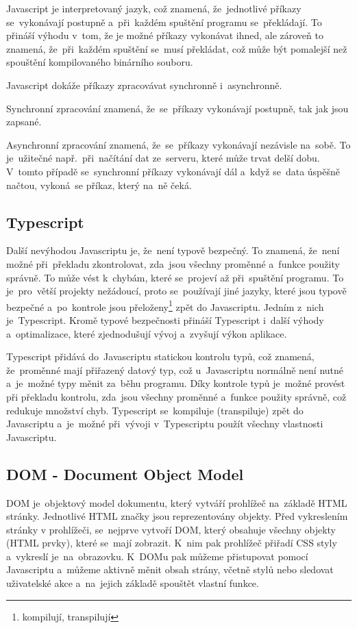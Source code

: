 \documentclass[14pt,a4paper]{article}
\begin{document}
        Javascript je interpretovaný jazyk, což znamená, že~jednotlivé příkazy se~vykonávají postupně a~při~každém spuštění programu se~překládají.
        To přináší výhodu v~tom, že je možné příkazy vykonávat ihned, ale zároveň to znamená, že~při~každém spuštění se~musí překládat,
        což může být pomalejší než spouštění kompilovaného binárního souboru.

        Javascript dokáže příkazy zpracovávat synchronně i~asynchronně.
        
        Synchronní zpracování znamená, že~se~příkazy vykonávají postupně, tak jak
        jsou zapsané.
        
        Asynchronní zpracování znamená, že~se~příkazy vykonávají nezávisle na~sobě. To je~užitečné např.~při~načítání dat ze~serveru,
        které může trvat delší dobu. V~tomto případě se~synchronní příkazy vykonávají dál a~když se~data úspěšně načtou, vykoná~se příkaz, který na~ně čeká.

        \subsection{Typescript}
        Další nevýhodou Javascriptu je, že~není typově bezpečný. To znamená, že~není možné při~překladu zkontrolovat, zda~jsou všechny proměnné
        a~funkce použity správně. To může vést k~chybám, které se~projeví až při~spuštění programu. To je~pro~větší projekty nežádoucí, proto se~používají
        jiné jazyky, které jsou typově bezpečné a~po~kontrole jsou přeloženy\footnote{kompilují, transpilují} zpět do Javascriptu. Jedním z~nich je~Typescript.
        Kromě typové bezpečnosti přináší Typescript i~další výhody a~optimalizace, které zjednodušují vývoj a~zvyšují výkon aplikace.

        Typescript přidává do~Javascriptu statickou kontrolu typů, což znamená, že~proměnné mají přiřazený datový typ, což
        u~Javascriptu normálně není nutné a~je~možné typy měnit za~běhu programu.
        Díky kontrole typů je~možné provést při překladu kontrolu, zda~jsou všechny proměnné a~funkce použity správně, což redukuje množství chyb.
        Typescript se~kompiluje (transpiluje) zpět do Javascriptu a~je~možné při~vývoji v~Typescriptu použít všechny vlastnosti Javascriptu.

        \subsection{DOM - Document Object Model}
        DOM je~objektový model dokumentu, který vytváří prohlížeč na~základě HTML stránky. Jednotlivé HTML značky jsou reprezentovány objekty.
        Před vykreslením stránky v prohlížeči, se~nejprve vytvoří DOM, který obsahuje všechny objekty (HTML prvky), které se~mají zobrazit.
        K~nim pak prohlížeč přiřadí CSS styly a~vykreslí je~na~obrazovku. K~DOMu pak můžeme přistupovat pomocí Javascriptu
        a~můžeme aktivně měnit obsah strány, včetně stylů nebo sledovat uživatelské akce a~na~jejich základě spouštět vlastní funkce.
        
\end{document}
